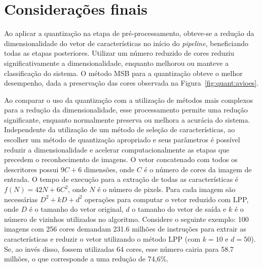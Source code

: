 \section{Considerações finais}

Ao aplicar a quantização na etapa de pré-processamento, obteve-se a redução da dimensionalidade do vetor de características no início do \textit{pipeline}, beneficiando todas as etapas posteriores. Utilizar um número reduzido de cores reduziu significativamente a dimensionalidade, enquanto melhorou ou manteve a classificação do sistema. O método MSB para a quantização obteve o melhor desempenho, dada a preservação das cores observada na Figura~\ref{fig:quant:avioes}.

Ao comparar o uso da quantização com a utilização de métodos mais complexos para a redução da dimensionalidade, esse processamento permite uma redução significante, enquanto normalmente preserva ou melhora a acurácia do sistema. Independente da utilização de um método de seleção de características, ao escolher um método de quantização apropriado e seus parâmetros é possível reduzir a dimensionalidade e acelerar computacionalmente as etapas que precedem o reconhecimento de imagens. O vetor concatenado com todos os descritores possui $9C + 6$ dimensões, onde $C$ é o número de cores da imagem de entrada. O tempo de execução para a extração de todas as características é $f(N) = 42N + 6C^2$, onde $N$ é o número de pixels. Para cada imagem são necessárias $D^2 + kD + d^2$ operações para computar o vetor reduzido com LPP, onde $D$ é o tamanho do vetor original, $d$ o tamanho do vetor de saída e $k$ é o número de vizinhos utilizados no algoritmo. Considere o seguinte exemplo: 100 imagens com 256 cores demandam 231.6 milhões de instruções para extrair as características e reduzir o vetor utilizando o método LPP (com $k = 10$ e $d = 50$). Se, ao invés disso, fossem utilizadas 64 cores, esse número cairia para 58.7 milhões, o que corresponde a uma redução de 74,6\%.
